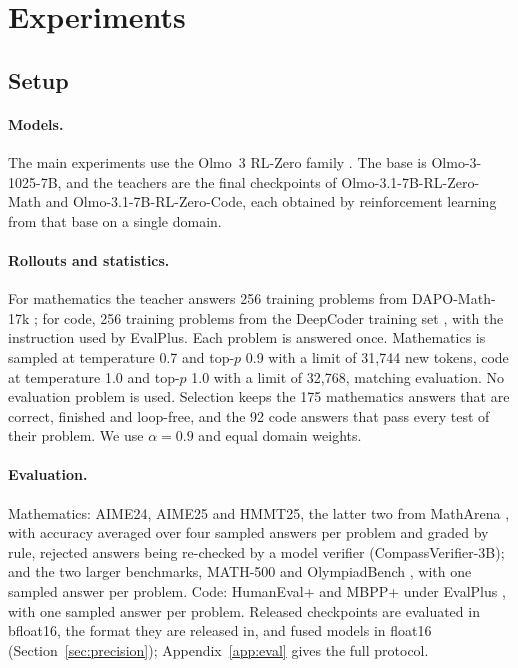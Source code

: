 \section{Experiments}
\label{sec:exp}

\subsection{Setup}
\label{sec:setup}

\paragraph{Models.} The main experiments use the Olmo~3 RL-Zero family
\citep{olmo2025olmo3}. The base is Olmo-3-1025-7B, and the teachers are the
final checkpoints of Olmo-3.1-7B-RL-Zero-Math and Olmo-3.1-7B-RL-Zero-Code,
each obtained by reinforcement learning from that base on a single domain.

\paragraph{Rollouts and statistics.} For mathematics the teacher answers 256
training problems from DAPO-Math-17k \citep{yu2025dapo}; for code, 256
training problems from the DeepCoder training set \citep{luo2025deepcoder},
with the instruction used by EvalPlus. Each problem is answered once.
Mathematics is sampled at temperature 0.7 and top-$p$ 0.9 with a limit of
31{,}744 new tokens, code at temperature 1.0 and top-$p$ 1.0 with a limit of
32{,}768, matching evaluation. No evaluation problem is used. Selection keeps
the 175 mathematics answers that are correct, finished and loop-free, and the
92 code answers that pass every test of their problem. We use $\alpha=0.9$
and equal domain weights.

\paragraph{Evaluation.} Mathematics: AIME24, AIME25 and HMMT25, the latter
two from MathArena \citep{balunovic2025matharena}, with accuracy averaged
over four sampled answers per problem and graded by rule, rejected answers
being re-checked by a model verifier (CompassVerifier-3B); and the two larger
benchmarks, MATH-500 \citep{hendrycks2021math} and OlympiadBench
\citep{he2024olympiadbench}, with one sampled answer per problem. Code:
HumanEval+ and MBPP+ under EvalPlus
\citep{chen2021codex,austin2021mbpp,liu2023evalplus}, with one sampled answer
per problem. Released checkpoints are evaluated in bfloat16, the format they
are released in, and fused models in float16 (Section~\ref{sec:precision});
Appendix~\ref{app:eval} gives the full protocol.

